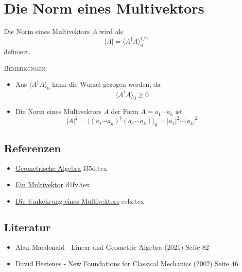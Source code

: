 \documentclass{sajzk}
\begin{document}
\section{Die Norm eines Multivektors}
\label{deuk}
Die Norm eines Multivektors $A$ wird als
\[|A|=\langle A^\dagger A \rangle_0^{1/2}\]
definiert.

\textsc{Bemerkungen:}
\begin{itemize}
  \item Aus $\langle A^\dagger A \rangle_0$ kann die Wurzel gezogen werden, da
    \[
    \langle A^\dagger A \rangle_0 \geq 0
    \]
\item Die Norm eines Multivektors $A$ der Form $A = a_1\cdots a_k$ ist
  \[
  |A|^2 = \langle (a_1\cdots a_k)^\dagger(a_1\cdots a_k) \rangle_0 = |a_1|^2\cdots |a_k|^2
  \]
\end{itemize}

\subsection{Referenzen}
\begin{itemize}
    \item \href{f35d.pdf}{Geometrische Algebra} f35d.tex
    \item \href{d1fv.pdf}{Ein Multivektor} d1fv.tex
    \item \href{eelx.pdf}{Die Umkehrung eines Multivektors} eelx.tex
\end{itemize}

\subsection{Literatur}
\begin{itemize}
  \item Alan Macdonald - Linear and Geometric Algebra (2021) Seite 82
  \item David Hestenes - New Foundations for Classical Mechanics (2002) Seite 46
\end{itemize}
\end{document}
